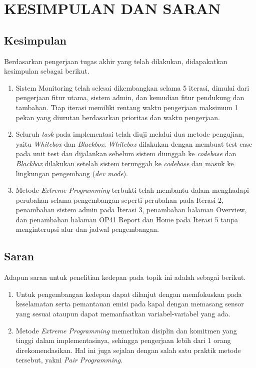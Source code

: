 
\chapter{KESIMPULAN DAN SARAN}


\section{Kesimpulan}
Berdasarkan pengerjaan tugas akhir yang telah dilakukan, didapakatkan kesimpulan sebagai berikut.

\begin{enumerate}
    \item Sistem Monitoring telah selesai dikembangkan selama 5 iterasi, dimulai dari pengerjaan fitur utama, sistem admin, dan kemudian fitur pendukung dan tambahan. Tiap iterasi memiliki rentang waktu pengerjaan maksimum 1 pekan yang diurutan berdasarkan prioritas dan waktu pengerjaan.
    \item Seluruh \textit{task} pada implementasi telah diuji melalui dua metode pengujian, yaitu \textit{Whitebox} dan \textit{Blackbox}. \textit{Whitebox} dilakukan dengan membuat test case pada unit test dan dijalankan sebelum sistem diunggah ke \textit{codebase} dan \textit{Blackbox} dilakukan setelah sistem terunggah ke \textit{codebase} dan masuk ke lingkungan pengembang (\textit{dev mode}).
    \item Metode \textit{Extreme Programming} terbukti telah membantu dalam menghadapi perubahan selama pengembangan seperti perubahan pada Iterasi 2, penambahan sistem admin pada Iterasi 3, penambahan halaman Overview, dan penambahan halaman OP41 Report dan Home pada Iterasi 5 tanpa menginterupsi alur dan jadwal pengembangan.
\end{enumerate}

\section{Saran}

Adapun saran untuk penelitian kedepan pada topik ini adalah sebagai berikut.

\begin{enumerate}
    \item Untuk pengembangan kedepan dapat dilanjut dengan memfokuskan pada keselamatan serta pemantauan emisi pada kapal dengan memasang sensor yang sesuai ataupun dapat memanfaatkan variabel-variabel yang ada.
    \item Metode \textit{Extreme Programming} memerlukan disiplin dan komitmen yang tinggi dalam implementasinya, sehingga pengerjaan lebih dari 1 orang direkomendasikan. Hal ini juga sejalan dengan salah satu praktik metode tersebut, yakni \textit{Pair Programming}.
\end{enumerate}